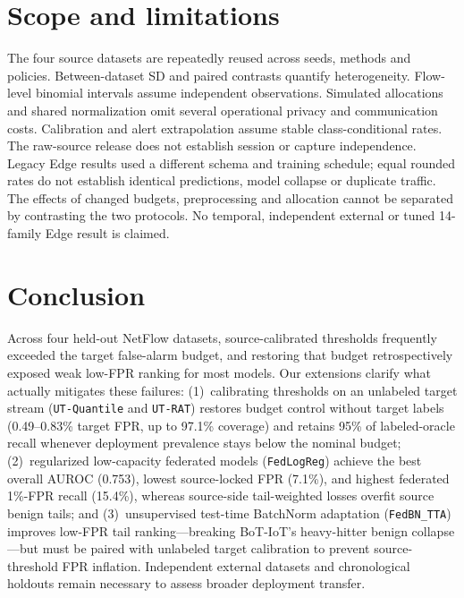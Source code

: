 \documentclass[journal,10pt]{IEEEtran}
\begin{document}
\section{Scope and limitations}
The four source datasets are repeatedly reused across seeds, methods and policies. Between-dataset SD and paired contrasts quantify heterogeneity. Flow-level binomial intervals assume independent observations. Simulated allocations and shared normalization omit several operational privacy and communication costs. Calibration and alert extrapolation assume stable class-conditional rates. The raw-source release does not establish session or capture independence. Legacy Edge results used a different schema and training schedule; equal rounded rates do not establish identical predictions, model collapse or duplicate traffic. The effects of changed budgets, preprocessing and allocation cannot be separated by contrasting the two protocols. No temporal, independent external or tuned 14-family Edge result is claimed.

\section{Conclusion}
Across four held-out NetFlow datasets, source-calibrated thresholds frequently exceeded the target false-alarm budget, and restoring that budget retrospectively exposed weak low-FPR ranking for most models. Our extensions clarify what actually mitigates these failures: (1)~calibrating thresholds on an unlabeled target stream (\texttt{UT-Quantile} and \texttt{UT-RAT}) restores budget control without target labels (0.49--0.83\% target FPR, up to 97.1\% coverage) and retains 95\% of labeled-oracle recall whenever deployment prevalence stays below the nominal budget; (2)~regularized low-capacity federated models (\texttt{FedLogReg}) achieve the best overall AUROC (0.753), lowest source-locked FPR (7.1\%), and highest federated 1\%-FPR recall (15.4\%), whereas source-side tail-weighted losses overfit source benign tails; and (3)~unsupervised test-time BatchNorm adaptation (\texttt{FedBN\_TTA}) improves low-FPR tail ranking---breaking BoT-IoT's heavy-hitter benign collapse---but must be paired with unlabeled target calibration to prevent source-threshold FPR inflation. Independent external datasets and chronological holdouts remain necessary to assess broader deployment transfer.
\end{document}
